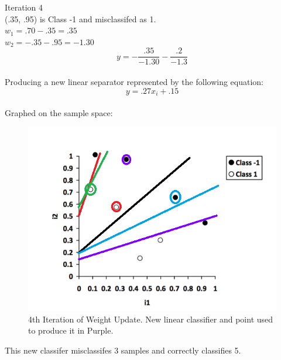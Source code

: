 \documentclass[12pt]{article}
\begin{document}
Iteration 4 \\
(.35, .95) is Class -1 and misclassifed as 1.\\
$w_1 = .70-.35 = .35$\\
$w_2= -.35-.95 = -1.30$\\
\begin{equation}
y = -\frac{.35}{-1.30} - \frac{.2}{-1.3}
\end{equation}\\
Producing a new linear separator represented by the following equation:\\
\begin{equation}
y = .27x_i + .15
\end{equation}\\
Graphed on the sample space: \\
\begin{figure}[H]
    \centering
    \includegraphics[width=1\textwidth]{question_4_plot_a_it4}
    \caption{4th Iteration of Weight Update. New linear classifier and point used to produce it in Purple.}
    \label{fig:question_4_plot_a_it4}
\end{figure}
This new classifer misclassifes 3 samples and correctly classifies 5.\\
\end{document}
